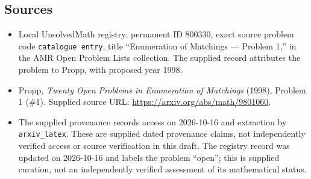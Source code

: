 \documentclass[11pt]{article}
\begin{document}
\subsection{Sources}
\begin{itemize}
\item Local UnsolvedMath registry: permanent ID \(800330\), exact source problem code \texttt{catalogue entry}, title ``Enumeration of Matchings — Problem 1,'' in the AMR Open Problem Lists collection. The supplied record attributes the problem to Propp, with proposed year 1998.
\item Propp, \emph{Twenty Open Problems in Enumeration of Matchings} (1998), Problem 1 (\#1). Supplied source URL: \url{https://arxiv.org/abs/math/9801060}.
\item The supplied provenance records access on 2026-10-16 and extraction by \texttt{arxiv\_latex}. These are supplied dated provenance claims, not independently verified access or source verification in this draft. The registry record was updated on 2026-10-16 and labels the problem ``open''; this is supplied curation, not an independently verified assessment of its mathematical status.
\end{itemize}
\end{document}
